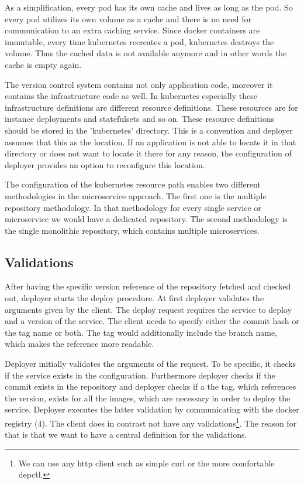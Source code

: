 As a simplification, every pod has its own cache and lives as long as the pod. So every
pod utilizes its own volume as a cache and there is no need for communication to an extra
caching service. Since docker containers are immutable, every time kubernetes recreates a
pod, kubernetes destroys the volume. Thus the cached data is not available anymore and in
other words the cache is empty again.

The version control system contains not only application code, moreover it contains the
infrastructure code as well. In kubernetes especially these infrastructure definitions are
different resource definitions. These resources are for instance deployments and
statefulsets and so on. These resource definitions should be stored in the 'kubernetes'
directory. This is a convention and deployer assumes that this as the location. If an
application is not able to locate it in that directory or does not want to locate it there
for any reason, the configuration of deployer provides an option to reconfigure this
location.

The configuration of the kubernetes resource path enables two different methodologies in
the microservice approach. The first one is the multiple repository methodology. In that
methodology for every single service or microservice we would have a dedicated repository.
The second methodology is the single monolithic repository, which contains multiple
microservices.

\subsection{Validations}

After having the specific version reference of the repository fetched and checked out,
deployer starts the deploy procedure. At first deployer validates the arguments given by
the client. The deploy request requires the service to deploy and a version of the
service. The client needs to specify either the commit hash or the tag name or both. The
tag would additionally include the branch name, which makes the reference more readable.

Deployer initially validates the arguments of the request. To be specific, it checks if
the service exists in the configuration. Furthermore deployer checks if the commit exists
in the repository and deployer checks if a the tag, which references the version, exists
for all the images, which are necessary in order to deploy the service. Deployer executes
the latter validation by communicating with the docker registry (4). The client does in
contrast not have any validations\footnote{We can use any http client such as simple curl
  or the more comfortable depctl.}. The reason for that is that we want to have a central
definition for the validations.

